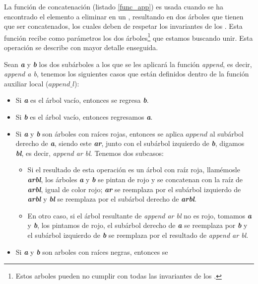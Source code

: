 La funci\'on de concatenación (listado \ref{func_app}) es usada cuando se ha encontrado el elemento a 
eliminar en un {\arn}, resultando en dos \'arboles que tienen que ser concatenados, los cuales deben 
de respetar los invariantes de los {\arns}. Esta funci\'on recibe como parámetros los dos 
\'arboles\footnote{Estos arboles pueden no cumplir con todas las invariantes de los {\arns}.} que 
estamos buscando unir. Esta operación se describe con mayor detalle enseguida.

Sean \textbf{\textit{a}} y \textbf{\textit{b}} los dos subárboles a los que se les aplicar\'a la 
funci\'on \emph{append}, es decir, \textit{append a b}, tenemos los siguientes casos que están definidos 
dentro de la funci\'on auxiliar local ($append\_l$):

\begin{itemize}
    \item Si \textbf{\textit{a}} es el \'arbol vacío, entonces se regresa \textbf{\textit{b}}.
    \item Si \textbf{\textit{b}} es el \'arbol vacío, entonces regresamos \textbf{\textit{a}}.
    \item Si \textbf{\textit{a}} y \textbf{\textit{b}} son \'arboles con raíces rojas, entonces se 
    aplica \hyperref[func_app]{$append$} al subárbol derecho de \textbf{\textit{a}}, siendo este \textbf{\textit{ar}}, 
    junto con el subárbol izquierdo de \textbf{\textit{b}}, digamos \textbf{\textit{bl}}, es decir, 
    \textit{append ar bl}. Tenemos dos subcasos:
    \begin{itemize}
      \item Si el resultado de esta operación es un árbol con raíz roja, llam\'emosle \textbf{\textit{arbl}},
      los \'arboles \textbf{\textit{a}} y \textbf{\textit{b}} se pintan de rojo y se concatenan con 
      la raíz de \textbf{\textit{arbl}}, igual de color rojo; \textbf{\textit{ar}} se reemplaza por 
      el subárbol izquierdo de \textbf{\textit{arbl}} y \textbf{\textit{bl}} se reemplaza por el
      subárbol derecho de \textbf{\textit{arbl}}.
      \item En otro caso, si el \'arbol resultante de \textit{append ar bl} no es rojo, tomamos 
      \textbf{\textit{a}} y \textbf{\textit{b}}, los pintamos de rojo, el subárbol derecho de
      \textbf{\textit{a}} se reemplaza por \textbf{\textit{b}} y el subárbol izquierdo de 
      \textbf{\textit{b}} se reemplaza por el resultado de \textit{append ar bl}.
    \end{itemize}
    \item Si \textbf{\textit{a}} y \textbf{\textit{b}} son arboles con raíces negras, entonces se 

\end{itemize}
